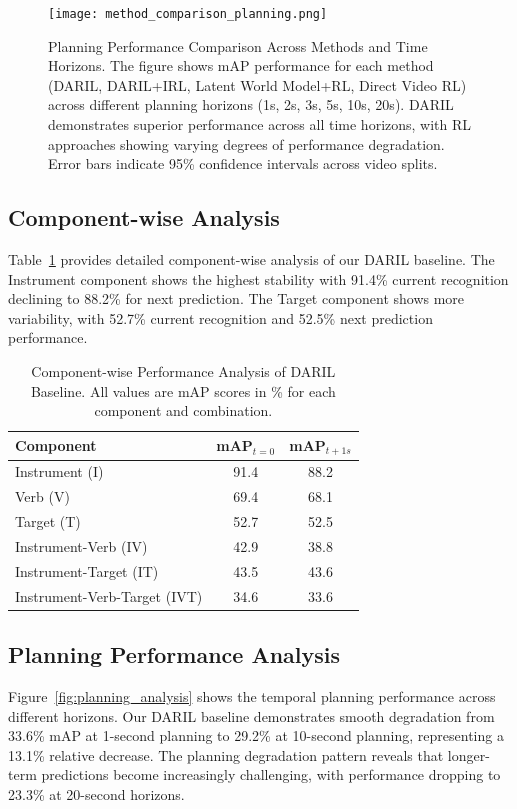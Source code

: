 \documentclass[runningheads]{llncs}
\begin{document}
\begin{figure}[h]
\centering
\texttt{[image: method\_comparison\_planning.png]}
\caption{Planning Performance Comparison Across Methods and Time Horizons. The figure shows mAP performance for each method (DARIL, DARIL+IRL, Latent World Model+RL, Direct Video RL) across different planning horizons (1s, 2s, 3s, 5s, 10s, 20s). DARIL demonstrates superior performance across all time horizons, with RL approaches showing varying degrees of performance degradation. Error bars indicate 95\% confidence intervals across video splits.}
\label{fig:method_comparison}
\end{figure}

\subsection{Component-wise Analysis}

Table~\ref{tab:component_analysis} provides detailed component-wise analysis of our DARIL baseline. The Instrument component shows the highest stability with 91.4\% current recognition declining to 88.2\% for next prediction. The Target component shows more variability, with 52.7\% current recognition and 52.5\% next prediction performance.

\begin{table}[h]
\centering
\caption{Component-wise Performance Analysis of DARIL Baseline. All values are mAP scores in \% for each component and combination.}
\label{tab:component_analysis}
\begin{tabular}{lcc}
\toprule
\textbf{Component} & \textbf{mAP$_{t=0}$} & \textbf{mAP$_{t+1s}$} \\
\midrule
Instrument (I) & 91.4 & 88.2 \\
Verb (V) & 69.4 & 68.1 \\
Target (T) & 52.7 & 52.5 \\
\midrule
Instrument-Verb (IV) & 42.9 & 38.8 \\
Instrument-Target (IT) & 43.5 & 43.6 \\
Instrument-Verb-Target (IVT) & 34.6 & 33.6 \\
\bottomrule
\end{tabular}
\end{table}

\subsection{Planning Performance Analysis}

Figure~\ref{fig:planning_analysis} shows the temporal planning performance across different horizons. Our DARIL baseline demonstrates smooth degradation from 33.6\% mAP at 1-second planning to 29.2\% at 10-second planning, representing a 13.1\% relative decrease. The planning degradation pattern reveals that longer-term predictions become increasingly challenging, with performance dropping to 23.3\% at 20-second horizons.
\end{document}
